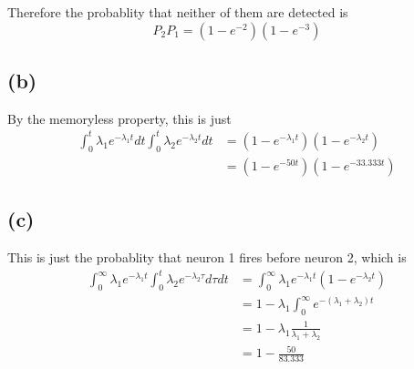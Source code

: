 \documentclass[12pt]{article}
\begin{document}
Therefore the probablity that neither of them are detected is 
$$P_{2}P_{1}=(1-e^{-2})(1-e^{-3})$$
\subsection*{(b)}
By the memoryless property, this is just
\begin{align*}
    \int_{0}^{t}\lambda_1 e^{-\lambda_1 t}dt\int_{0}^{t}\lambda_2 e^{-\lambda_2 t}dt
    &=(1-e^{-\lambda_1t})(1-e^{-\lambda_2t})\\
    &=\boxed{(1-e^{-50t})(1-e^{-33.333t})}
\end{align*}
\subsection*{(c)}
This is just the probablity that neuron 1 fires before
neuron 2, which is 
\begin{align*}
    \int_{0}^{\infty}\lambda_1e^{-\lambda_1 t}\int_{0}^{t}\lambda_2e^{-\lambda_2 \tau}d\tau dt
    &=\int_{0}^{\infty}\lambda_1e^{-\lambda_1 t}(1-e^{-\lambda_2 t})\\
    &=1-\lambda_1\int_{0}^{\infty}e^{-(\lambda_1+\lambda_2) t}\\
    &=1-\lambda_1\frac{1}{\lambda_1+\lambda_2}\\
    &=\boxed{1-\frac{50}{83.333}}
\end{align*}
\end{document}
